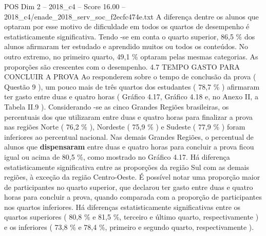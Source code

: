 \begin{textsample}{POS Dim 2 – 2018\_c4 – Score 16.00 – 2018\_c4/enade\_2018\_serv\_soc\_f2ecfc474e.txt}
A diferença dentre os alunos que optaram por esse motivo de dificuldade em todos os quartos de desempenho é estatisticamente significativa.
Tendo -se em conta o quarto superior, 86,5 \% dos alunos afirmaram ter estudado e aprendido muitos ou todos os conteúdos.
No outro extremo, no primeiro quarto, 49,1 \% optaram pelas mesmas categorias.
As proporções são crescentes com o desempenho. 4.7 TEMPO GASTO PARA CONCLUIR A PROVA Ao responderem sobre o tempo de conclusão da prova ( Questão 9 ), um pouco mais de três quartos dos estudantes ( 78,7 \% ) afirmaram ter gasto entre duas e quatro horas ( Gráfico 4.17, Gráfico 4.18 e, no Anexo II, a Tabela II.9 ).
Considerando -se as cinco Grandes Regiões brasileiras, os percentuais dos que utilizaram entre duas e quatro horas para finalizar a prova nas regiões Norte ( 76,2 \% ), Nordeste ( 75,9 \% ) e Sudeste ( 77,9 \% ) foram inferiores ao percentual nacional.
Nas demais Grandes Regiões, o percentual de alunos que \textbf{dispensaram} entre duas e quatro horas para concluir a prova ficou igual ou acima de 80,5 \%, como mostrado no Gráfico 4.17.
Há diferença estatisticamente significativa entre as proporções da região Sul com as demais regiões, à exceção da região Centro-Oeste.
É possível notar uma proporção maior de participantes no quarto superior, que declarou ter gasto entre duas e quatro horas para concluir a prova, quando comparada com a proporção de participantes nos quartos inferiores.
Há diferenças estatisticamente significativas entre os quartos superiores ( 80,8 \% e 81,5 \%, terceiro e último quarto, respectivamente ) e os inferiores ( 73,8 \% e 78,4 \%, primeiro e segundo quarto, respectivamente ).

\end{textsample}

